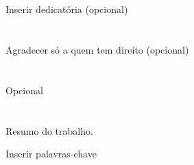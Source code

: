 
\newpage
\section*{}
\vspace{0.5cm}
Inserir dedicatória (opcional)
\cleardoublepage

\newpage
\section*{}
\vspace{0.5cm}
Agradecer só a quem tem direito (opcional)
\cleardoublepage

\newpage
\section*{}
\vspace{0.5cm}
Opcional
\cleardoublepage

\newpage
\section*{}
\vspace{0.5cm}
Resumo do trabalho.

\vspace{2.2cm}
{}

\vspace{0.8cm}
Inserir palavras-chave
\cleardoublepage



\tableofcontents

\listoffigures
\cleardoublepage

\listoftables
\cleardoublepage

\newpage

\cleardoublepage

